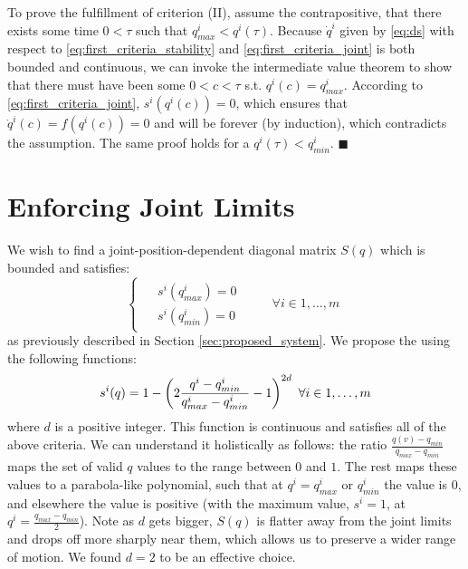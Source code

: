 \documentclass[letterpaper, 10 pt, conference,fleqn]{ieeeconf}
\begin{document}
To prove the fulfillment of criterion (II), assume the contrapositive, that there exists some time $0<\tau$ such that $q^i_{max} < q^i(\tau) $. Because $\dot{q}^i$ given by \eqref{eq:ds} with respect to \eqref{eq:first_criteria_stability} and  \eqref{eq:first_criteria_joint}  is both bounded and continuous, we can invoke the intermediate value theorem to show that there must have been some $0<c<\tau$ s.t. $q^i(c) = q^i_{max}$. According to \eqref{eq:first_criteria_joint}, $s^i(q^i(c)) = 0$, which ensures that $\dot{q}^i(c) = f(q^i(c)) = 0$ and will be forever (by induction), which contradicts the assumption. The same proof holds for a $q^i(\tau) < q^i_{min} $.  $\blacksquare$
\section{Enforcing Joint Limits}
\label{appendix:limits}
We wish to find a joint-position-dependent diagonal matrix $S(q)$ which is bounded and satisfies:
\begin{equation}
\label{eq:last_criteria}
\begin{cases}
\begin{split}
& s^{i}(q^i_{max}) = 0&&&\\
& s^{i}(q^i_{min})= 0&&&
\end{split}
\forall i\in 1,\dots,m
\end{cases}
\end{equation}
as previously described in Section \ref{sec:proposed_system}. We propose the using the following functions:
\begin{equation}
s^{i}(q) =
1 - \left ( 2\frac{q^i - q^i_{min}}{q^i_{max} - q^i_{min}} - 1 \right ) ^{2d}  ~\forall i\in 1,\dots,m\\
\end{equation}
where $d$ is a positive integer. 
This function is continuous and satisfies all of the above criteria. We can understand it holistically as follows: the ratio $\frac{q(v) - q_{min}}{q_{max} - q_{min}}$ maps the set of valid $q$ values to the range between $0$ and $1$. The rest maps these values to a parabola-like polynomial, such that at $q^i = q^i_{max}$ or $q^i_{min}$ the value is $0$, and elsewhere the value is positive (with the maximum value, $s^i = 1$, at $q^i = \frac{q_{max} - q_{min}}{2}$). Note as $d$ gets bigger, $S(q)$ is flatter away from the joint limits and drops off more sharply near them, which allows us to preserve a wider range of motion. We found $d=2$ to be an effective choice.\\
\end{document}
